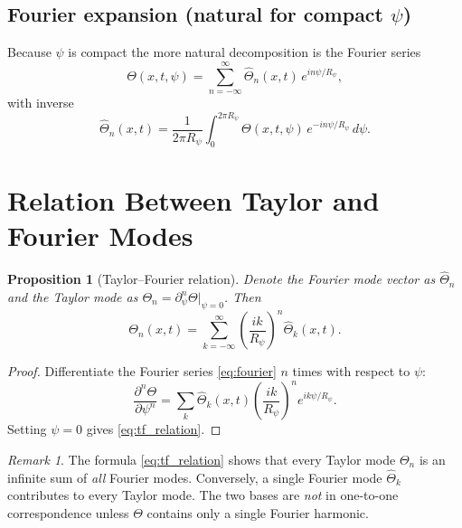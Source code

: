 \documentclass[12pt,a4paper]{article}
\newtheorem{proposition}[theorem]{Proposition}
\theoremstyle{remark}
\newtheorem{remark}[theorem]{Remark}
\begin{document}
\subsection{Fourier expansion (natural for compact $\psi$)}

Because $\psi$ is compact the more natural decomposition is the Fourier
series
\begin{equation}
  \label{eq:fourier}
  \Theta(x,t,\psi)
  = \sum_{n=-\infty}^{\infty}
    \hat{\Theta}_n(x,t)\,e^{in\psi/R_\psi},
\end{equation}
with inverse
\begin{equation}
  \label{eq:fourier_inv}
  \hat{\Theta}_n(x,t)
  = \frac{1}{2\pi R_\psi}
    \int_0^{2\pi R_\psi} \Theta(x,t,\psi)\,e^{-in\psi/R_\psi}\,d\psi.
\end{equation}

\section{Relation Between Taylor and Fourier Modes}
\label{sec:relation}

\begin{proposition}[Taylor--Fourier relation]
\label{prop:tf_relation}
Denote the Fourier mode vector as $\hat\Theta_n$ and the Taylor mode
as $\Theta_n = \partial_\psi^n\Theta|_{\psi=0}$.  Then
\begin{equation}
  \label{eq:tf_relation}
  \Theta_n(x,t)
  = \sum_{k=-\infty}^{\infty}
    \left(\frac{ik}{R_\psi}\right)^n \hat\Theta_k(x,t).
\end{equation}
\end{proposition}

\begin{proof}
Differentiate the Fourier series \eqref{eq:fourier} $n$ times with
respect to $\psi$:
\[
  \frac{\partial^n\Theta}{\partial\psi^n}
  = \sum_k \hat\Theta_k(x,t)
    \left(\frac{ik}{R_\psi}\right)^n e^{ik\psi/R_\psi}.
\]
Setting $\psi=0$ gives \eqref{eq:tf_relation}.
\end{proof}

\begin{remark}
The formula \eqref{eq:tf_relation} shows that every Taylor mode
$\Theta_n$ is an infinite sum of \emph{all} Fourier modes.  Conversely,
a single Fourier mode $\hat\Theta_k$ contributes to every Taylor mode.
The two bases are \emph{not} in one-to-one correspondence unless $\Theta$
contains only a single Fourier harmonic.
\end{remark}
\end{document}
